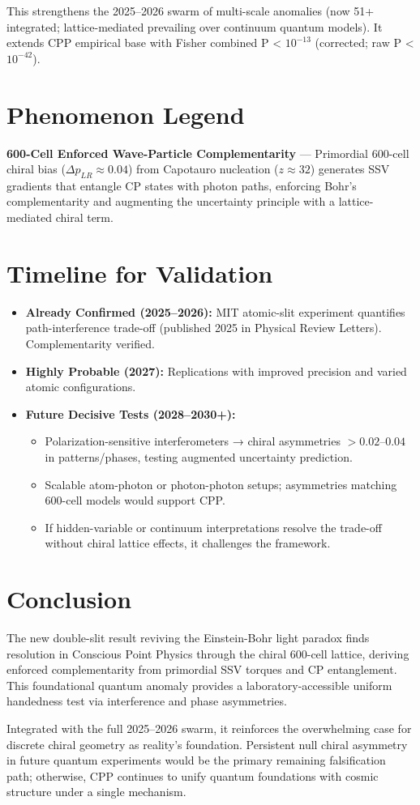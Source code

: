 \documentclass[11pt]{article}
\begin{document}
This strengthens the 2025--2026 swarm of multi-scale anomalies (now 51+ integrated; lattice-mediated prevailing over continuum quantum models). It extends CPP empirical base with Fisher combined P < $10^{-13}$ (corrected; raw P < $10^{-42}$).

\section{Phenomenon Legend}
\textbf{600-Cell Enforced Wave-Particle Complementarity} — Primordial 600-cell chiral bias ($\Delta p_{LR} \approx 0.04$) from Capotauro nucleation ($z \approx 32$) generates SSV gradients that entangle CP states with photon paths, enforcing Bohr's complementarity and augmenting the uncertainty principle with a lattice-mediated chiral term.

\section{Timeline for Validation}
\begin{itemize}
    \item \textbf{Already Confirmed (2025--2026):} MIT atomic-slit experiment quantifies path-interference trade-off (published 2025 in Physical Review Letters). Complementarity verified.
    \item \textbf{Highly Probable (2027):} Replications with improved precision and varied atomic configurations.
    \item \textbf{Future Decisive Tests (2028--2030+):}
    \begin{itemize}
        \item Polarization-sensitive interferometers → chiral asymmetries $>0.02$--$0.04$ in patterns/phases, testing augmented uncertainty prediction.
        \item Scalable atom-photon or photon-photon setups; asymmetries matching 600-cell models would support CPP.
        \item If hidden-variable or continuum interpretations resolve the trade-off without chiral lattice effects, it challenges the framework.
    \end{itemize}
\end{itemize}

\section{Conclusion}
The new double-slit result reviving the Einstein-Bohr light paradox finds resolution in Conscious Point Physics through the chiral 600-cell lattice, deriving enforced complementarity from primordial SSV torques and CP entanglement. This foundational quantum anomaly provides a laboratory-accessible uniform handedness test via interference and phase asymmetries.  

Integrated with the full 2025--2026 swarm, it reinforces the overwhelming case for discrete chiral geometry as reality's foundation. Persistent null chiral asymmetry in future quantum experiments would be the primary remaining falsification path; otherwise, CPP continues to unify quantum foundations with cosmic structure under a single mechanism.
\end{document}
